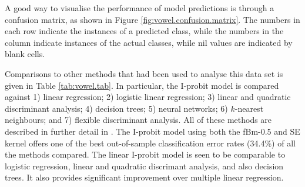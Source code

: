 \documentclass[a4paper,showframe,11pt]{report}\usepackage[]{graphicx}\usepackage[]{color}
\begin{document}
A good way to visualise the performance of model predictions is through a confusion matrix, as shown in Figure \ref{fig:vowel.confusion.matrix}.
The numbers in each row indicate the instances of a predicted class, while the numbers in the column indicate instances of the actual classes, while nil values are indicated by blank cells.

Comparisons to other methods that had been used to analyse this data set is given in Table \ref{tab:vowel.tab}.
In particular, the I-probit model is compared against 1) linear regression; 2) logistic linear regression; 3) linear and quadratic discriminant analysis; 4) decision trees; 5) neural networks; 6) $k$-nearest neighbours; and 7) flexible discriminant analysis.
All of these methods are described in further detail in \citet[Ch.4 \& 12, Table 12.3]{friedman2001elements}.
The I-probit model using both the fBm-0.5 and SE kernel offers one of the best out-of-sample classification error rates (34.4\%) of all the methods compared.
The linear I-probit model is seen to be comparable to logistic regression, linear and quadratic discrimant analysis, and also decision trees.
It also provides significant improvement over multiple linear regression.
\end{document}

